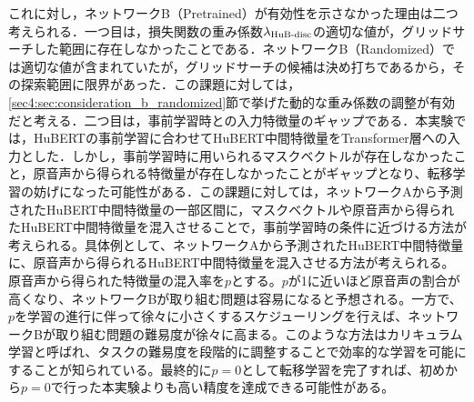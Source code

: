 これに対し，ネットワークB（Pretrained）が有効性を示さなかった理由は二つ考えられる．一つ目は，損失関数の重み係数$\lambda_{\text{HuB-disc}}$の適切な値が，グリッドサーチした範囲に存在しなかったことである．ネットワークB（Randomized）では適切な値が含まれていたが，グリッドサーチの候補は決め打ちであるから，その探索範囲に限界があった．この課題に対しては，\ref{sec4:sec:consideration_b_randomized}節で挙げた動的な重み係数の調整が有効だと考える．二つ目は，事前学習時との入力特徴量のギャップである．本実験では，HuBERTの事前学習に合わせてHuBERT中間特徴量をTransformer層への入力とした．しかし，事前学習時に用いられるマスクベクトルが存在しなかったこと，原音声から得られる特徴量が存在しなかったことがギャップとなり、転移学習の妨げになった可能性がある．この課題に対しては，ネットワークAから予測されたHuBERT中間特徴量の一部区間に，マスクベクトルや原音声から得られたHuBERT中間特徴量を混入させることで，事前学習時の条件に近づける方法が考えられる。具体例として、ネットワークAから予測されたHuBERT中間特徴量に、原音声から得られるHuBERT中間特徴量を混入させる方法が考えられる。原音声から得られた特徴量の混入率を$p$とする。$p$が1に近いほど原音声の割合が高くなり、ネットワークBが取り組む問題は容易になると予想される。一方で、$p$を学習の進行に伴って徐々に小さくするスケジューリングを行えば、ネットワークBが取り組む問題の難易度が徐々に高まる。このような方法はカリキュラム学習と呼ばれ、タスクの難易度を段階的に調整することで効率的な学習を可能にすることが知られている。最終的に$p = 0$として転移学習を完了すれば、初めから$p = 0$で行った本実験よりも高い精度を達成できる可能性がある。
